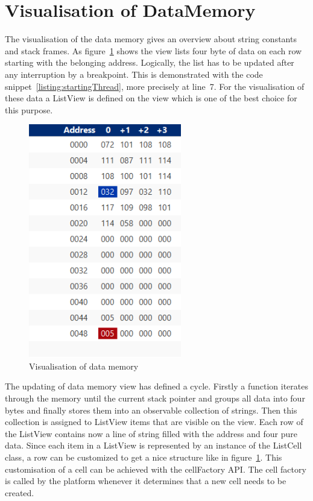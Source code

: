 \section{Visualisation of DataMemory}
\label{sec:implementationOfDataVisualisation}
The visualisation of the data memory gives an overview about string constants and stack frames. As figure~\ref{fig:dataMemoryView} shows the view lists four byte of data on each row starting with the belonging address. Logically, the list has to be updated after any interruption by a breakpoint. This is demonstrated with the code snippet~\ref{listing:startingThread}, more precisely at line~7.
For the visualisation of these data a ListView is defined on the view which is one of the best choice for this purpose. 
\begin{figure}[h] 
	\centering
	\includegraphics[scale=.99]{images/dataMemory.png}
	\caption{Visualisation of data memory}
	\label{fig:dataMemoryView}
\end{figure}
The updating of data memory view has defined a cycle. Firstly a function iterates through the memory until the current stack pointer and groups all data into four bytes and finally stores them into an observable collection of strings. Then this collection is assigned to ListView items that are visible on the view. Each row of the ListView contains now a line of string filled with the address and four pure data. Since each item in a ListView is represented by an instance of the ListCell class, a row can be customized to get a nice structure like in figure~\ref{fig:dataMemoryView}. This customisation of a cell can be achieved with the cellFactory API. The cell factory is called by the platform whenever it determines that a new cell needs to be created. 
